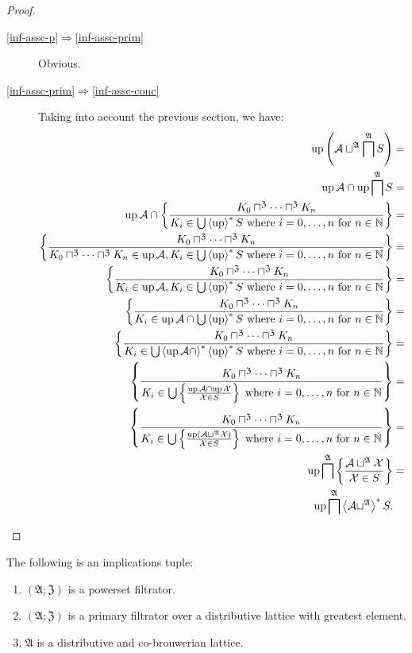 \begin{proof}
~
\begin{description}
\item [{\ref{inf-assc-p}$\Rightarrow$\ref{inf-assc-prim}}] Obvious.
\item [{\ref{inf-assc-prim}$\Rightarrow$\ref{inf-assc-conc}}] Taking
into account the previous section, we have:
\begin{align*}
\operatorname{up}\left(\mathcal{A}\sqcup^{\mathfrak{A}}\bigsqcap^{\mathfrak{A}}S\right) & =\\
\operatorname{up}\mathcal{A}\cap\operatorname{up}\bigsqcap^{\mathfrak{A}}S & =\\
\operatorname{up}\mathcal{A}\cap\left\{ \frac{K_{0}\sqcap^{\mathfrak{Z}}\dots\sqcap^{\mathfrak{Z}}K_{n}}{K_{i}\in\bigcup\left\langle \operatorname{up}\right\rangle ^{\ast}S\text{ where }i=0,\dots,n\text{ for }n\in\mathbb{N}}\right\} & =\\
\left\{ \frac{K_{0}\sqcap^{\mathfrak{Z}}\dots\sqcap^{\mathfrak{Z}}K_{n}}{K_{0}\sqcap^{\mathfrak{Z}}\dots\sqcap^{\mathfrak{Z}}K_{n}\in\operatorname{up}\mathcal{A},K_{i}\in\bigcup\left\langle \operatorname{up}\right\rangle ^{\ast}S\text{ where }i=0,\dots,n\text{ for }n\in\mathbb{N}}\right\} & =\\
\left\{ \frac{K_{0}\sqcap^{\mathfrak{Z}}\dots\sqcap^{\mathfrak{Z}}K_{n}}{K_{i}\in\operatorname{up}\mathcal{A},K_{i}\in\bigcup\left\langle \operatorname{up}\right\rangle ^{\ast}S\text{ where }i=0,\dots,n\text{ for }n\in\mathbb{N}}\right\} & =\\
\left\{ \frac{K_{0}\sqcap^{\mathfrak{Z}}\dots\sqcap^{\mathfrak{Z}}K_{n}}{K_{i}\in\operatorname{up}\mathcal{A}\cap\bigcup\left\langle \operatorname{up}\right\rangle ^{\ast}S\text{ where }i=0,\dots,n\text{ for }n\in\mathbb{N}}\right\} & =\\
\left\{ \frac{K_{0}\sqcap^{\mathfrak{Z}}\dots\sqcap^{\mathfrak{Z}}K_{n}}{K_{i}\in\bigcup\left\langle \operatorname{up}\mathcal{A}\cap\right\rangle ^{\ast}\left\langle \operatorname{up}\right\rangle ^{\ast}S\text{ where }i=0,\dots,n\text{ for }n\in\mathbb{N}}\right\} & =\\
\left\{ \frac{K_{0}\sqcap^{\mathfrak{Z}}\dots\sqcap^{\mathfrak{Z}}K_{n}}{K_{i}\in\bigcup\left\{ \frac{\operatorname{up}\mathcal{A}\cap\operatorname{up}\mathcal{X}}{\mathcal{X}\in S}\right\}\text{ where }i=0,\dots,n\text{ for }n\in\mathbb{N}}\right\} & =\\
\left\{ \frac{K_{0}\sqcap^{\mathfrak{Z}}\dots\sqcap^{\mathfrak{Z}}K_{n}}{K_{i}\in\bigcup\left\{ \frac{\operatorname{up}(\mathcal{A}\sqcup^{\mathfrak{A}}\mathcal{X})}{\mathcal{X}\in S}\right\}\text{ where }i=0,\dots,n\text{ for }n\in\mathbb{N}}\right\} & =\\
\operatorname{up}\bigsqcap^{\mathfrak{A}}\left\{ \frac{\mathcal{A}\sqcup^{\mathfrak{A}}\mathcal{X}}{\mathcal{X}\in S}\right\} & =\\
\operatorname{up}\bigsqcap^{\mathfrak{A}}\left\langle \mathcal{A}\sqcup^{\mathfrak{A}}\right\rangle ^{\ast}S.
\end{align*}

\end{description}
\end{proof}
\begin{cor}
\label{filt-also-distr}The following is an implications tuple:
\begin{enumerate}
\item $(\mathfrak{A};\mathfrak{Z})$ is a powerset filtrator.
\item $(\mathfrak{A};\mathfrak{Z})$ is a primary filtrator over a distributive
lattice with greatest element.
\item $\mathfrak{A}$ is a distributive and co-brouwerian lattice.
\end{enumerate}
\end{cor}

